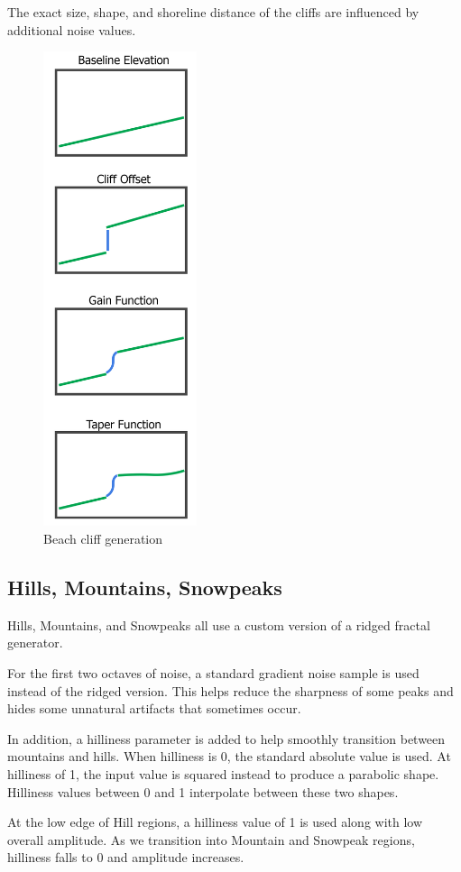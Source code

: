 The exact size, shape, and shoreline distance of the cliffs are influenced by additional noise values.

\begin{figure}
	\centering
		\includegraphics[width=0.4\textwidth]{figures/beachcliffs}
	\caption{Beach cliff generation}
	\label{fig:beach_cliffs}
\end{figure}

\subsection{Hills, Mountains, Snowpeaks}

Hills, Mountains, and Snowpeaks all use a custom version of a ridged fractal generator.

For the first two octaves of noise, a standard gradient noise sample is used instead of the ridged version.
This helps reduce the sharpness of some peaks and hides some unnatural artifacts that sometimes occur.

In addition, a hilliness parameter is added to help smoothly transition between mountains and hills.
When hilliness is 0, the standard absolute value is used.
At hilliness of 1, the input value is squared instead to produce a parabolic shape.
Hilliness values between 0 and 1 interpolate between these two shapes.

At the low edge of Hill regions, a hilliness value of 1 is used along with low overall amplitude.
As we transition into Mountain and Snowpeak regions, hilliness falls to 0 and amplitude increases.

